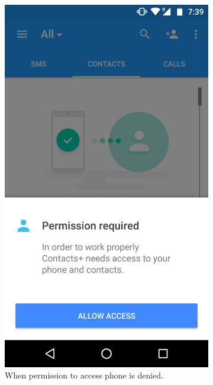 \begin{figure}[h]
	\centering
	\begin{subfigure}[h]{0.45\textwidth}
		\centering
		\includegraphics[width=\textwidth]{restrict_prob1.png}
		\caption{When permission to access phone is denied.}
	\end{subfigure}
	\hfill
	\begin{subfigure}[h]{0.45\textwidth}
		\centering

\end{subfigure}
\end{figure}
